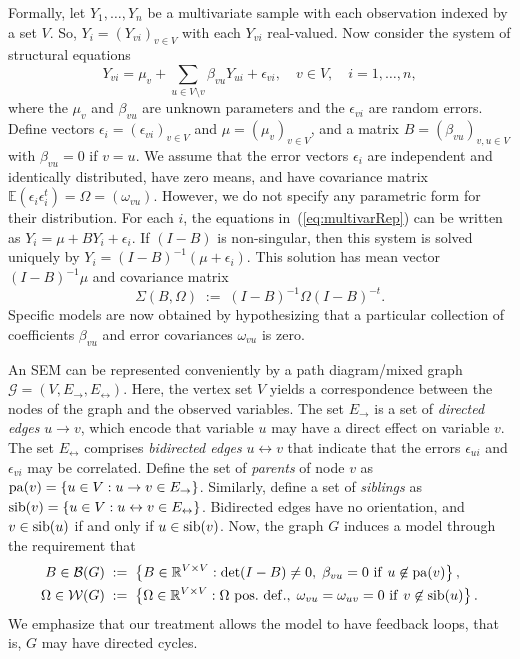 \documentclass[notitlepage]{article}
\newcommand{\pa}{{\rm pa}}       %
\newcommand{\sib}{{\rm sib}}	   %
\begin{document}
Formally, let $Y_1,\dots,Y_n$ be a multivariate sample with each
observation indexed by a set $V$.  So, $Y_i=(Y_{vi})_{v\in V}$ with each $Y_{vi}$ real-valued.  Now consider the system of
structural equations
\begin{equation}
\label{eq:multivarRep}
Y_{vi} = \mu_v + \sum_{u \in V \setminus v} \beta_{vu}Y_{ui} +
\epsilon_{vi}, \quad v\in V, \quad i=1,\dots,n,
\end{equation}
where the $\mu_v$ and $\beta_{vu}$ are unknown parameters and the
$\epsilon_{vi}$ are random errors.  Define vectors
$\epsilon_i=(\epsilon_{vi})_{v\in V}$ and $\mu=(\mu_v)_{v\in V}$, and
a matrix $B=(\beta_{vu})_{v,u\in V}$ with $\beta_{vu}=0$ if $v=u$.  We
assume that the error vectors $\epsilon_i$ are independent and
identically distributed, have zero means, and have covariance matrix
$\mathbb{E}\left(\epsilon_i \epsilon_i^t \right) =
\Omega=(\omega_{vu})$.  However, we do not specify any parametric form
for their distribution.  For each $i$, the equations
in~(\ref{eq:multivarRep}) can be written as
$Y_i = \mu + BY_i + \epsilon_i$.  If $(I - B)$ is non-singular, then
this system is solved uniquely by $Y_i=(I-B)^{-1}(\mu+\epsilon_i)$.
This solution has mean vector $(I-B)^{-1}\mu$ and covariance
matrix
\begin{equation} \label{eq:y_distribution}
\Sigma(B, \Omega) \;:=\; (I - B)^{-1}\Omega (I - B)^{-t}.
\end{equation}
Specific models are now obtained by hypothesizing that a particular
collection of coefficients $\beta_{vu}$ and error covariances $\omega_{vu}$
is zero.

An SEM can be represented conveniently by a path diagram/mixed graph
$\mathcal{G} = (V, E_\rightarrow, E_\leftrightarrow)$.  Here, the
vertex set $V$ yields a correspondence between the nodes of the graph
and the observed variables.  The set $E_\rightarrow$ is a set of
\emph{directed edges} $u \rightarrow v$, which encode that variable
$u$ may have a direct effect on variable $v$.  The set
$E_\leftrightarrow$ comprises \emph{bidirected edges}
$u \leftrightarrow v$ that indicate that the errors $\epsilon_{ui}$
and $\epsilon_{vi}$ may be correlated.  Define the set of
\emph{parents} of node $v$ as
$\pa(v)=\{u\in V: u\to v\in E_{\rightarrow}\}$.  Similarly, define a
set of \emph{siblings} as
$\sib(v)=\{u\in V: u\leftrightarrow v\in E_\leftrightarrow\}$.
Bidirected edges have no orientation, and $v\in\sib(u)$ if and only if
$u\in\sib(v)$.  Now, the graph $G$ induces a model through the
requirement that
\begin{align}
  \label{eq:par-space-B}
  B\in \mathcal{B}(G)&\;:=\; \left\{B\in\mathbb{R}^{V\times V}:\det(I-B) \neq 0,\;
                       \beta_{vu} = 0 \ \mathrm{if} \  u \not \in \pa(v)\right\},\\
    \label{eq:par-space-Omega}
  \Omega\in\mathcal{W}(G)&\;:=\; \left\{\Omega\in\mathbb{R}^{V\times
                           V}:\Omega \ \mathrm{pos.\ def.},\; \omega_{vu} = \omega_{uv}=0 \
                           \mathrm{if}\
                           v \not \in \sib(u)\right\}.
\end{align}
  We emphasize
that our treatment allows the model to have feedback loops, that is, $G$ may have directed cycles.
\end{document}
